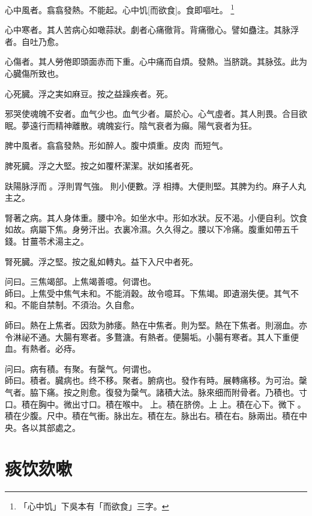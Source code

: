 \documentclass[11pt,oneside,b5paper]{ctexbook}
\begin{document}
\begin{flushleft}
心中風者。翕翕發熱。不能起。心中饥[而欲食]。食即嘔吐。
\footnote{「心中饥」下吳本有「而欲食」三字。}

心中寒者。其人苦病心如噉蒜狀。劇者心痛徹背。背痛徹心。譬如蠱注。其脉浮者。自吐乃愈。

心傷者。其人勞倦即頭面赤而下重。心中痛而自煩。發熱。当脐跳。其脉弦。此为心臓傷所致也。

心死臓。浮之実如麻豆。按之益躁疾者。死。

邪哭使魂魄不安者。血气少也。血气少者。屬於心。心气虛者。其人則畏。合目欲眠。夢遠行而精神離散。魂魄妄行。陰气衰者为癲。陽气衰者为狂。

脾中風者。翕翕發熱。形如醉人。腹中煩重。皮肉{𥆧}{𥆧}而短气。

脾死臓。浮之大堅。按之如覆杯潔潔。狀如搖者死。

趺陽脉浮而{𬈧}。浮則胃气強。{𬈧}則小便數。浮{𬈧}相摶。大便則堅。其脾为约。麻子人丸主之。

腎著之病。其人身体重。腰中冷。如坐水中。形如水狀。反不渴。小便自利。饮食如故。病屬下焦。身勞汗出。衣裏冷濕。久久得之。腰以下冷痛。腹重如帶五千錢。甘薑苓术湯主之。

腎死臓。浮之堅。按之亂如轉丸。益下入尺中者死。

问曰。三焦竭部。上焦竭善噫。何谓也。\\
師曰。上焦受中焦气未和。不能消穀。故令噫耳。下焦竭。即遺溺失便。其气不和。不能自禁制。不須治。久自愈。

師曰。熱在上焦者。因欬为肺痿。熱在中焦者。則为堅。熱在下焦者。則溺血。亦令淋祕不通。大腸有寒者。多鶩溏。有熱者。便腸垢。小腸有寒者。其人下重便血。有熱者。必痔。

问曰。病有積。有聚。有䅽气。何谓也。\\
師曰。積者。臓病也。终不移。聚者。腑病也。發作有時。展轉痛移。为可治。䅽气者。脇下痛。按之則愈。復發为䅽气。諸積大法。脉來细而附骨者。乃積也。寸口。積在胸中。微出寸口。積在喉中。{𬮦}上。積在脐傍。上{𬮦}上。積在心下。微下{𬮦}。積在少腹。尺中。積在气衝。脉出左。積在左。脉出右。積在右。脉兩出。積在中央。各以其部處之。

\chapter{痰饮欬嗽}


\end{flushleft}
\end{document}

